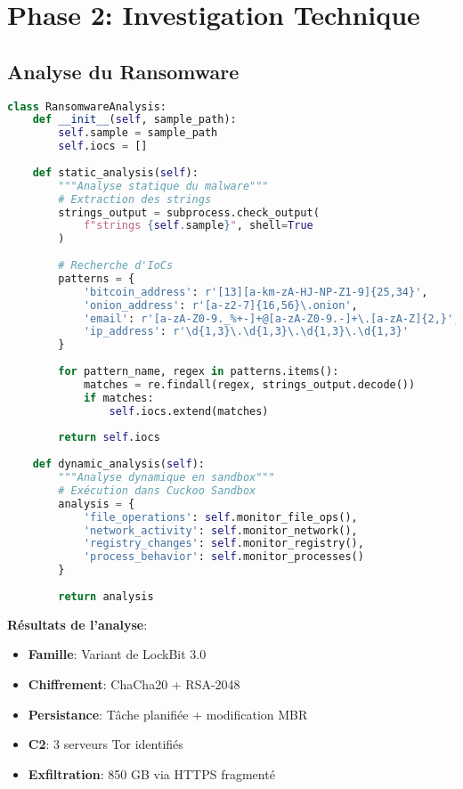 \section{Phase 2: Investigation Technique}
\subsection{Analyse du Ransomware}
\begin{lstlisting}[language=Python, caption=Analyse du sample de ransomware]
class RansomwareAnalysis:
    def __init__(self, sample_path):
        self.sample = sample_path
        self.iocs = []
    
    def static_analysis(self):
        """Analyse statique du malware"""
        # Extraction des strings
        strings_output = subprocess.check_output(
            f"strings {self.sample}", shell=True
        )
        
        # Recherche d'IoCs
        patterns = {
            'bitcoin_address': r'[13][a-km-zA-HJ-NP-Z1-9]{25,34}',
            'onion_address': r'[a-z2-7]{16,56}\.onion',
            'email': r'[a-zA-Z0-9._%+-]+@[a-zA-Z0-9.-]+\.[a-zA-Z]{2,}',
            'ip_address': r'\d{1,3}\.\d{1,3}\.\d{1,3}\.\d{1,3}'
        }
        
        for pattern_name, regex in patterns.items():
            matches = re.findall(regex, strings_output.decode())
            if matches:
                self.iocs.extend(matches)
        
        return self.iocs
    
    def dynamic_analysis(self):
        """Analyse dynamique en sandbox"""
        # Exécution dans Cuckoo Sandbox
        analysis = {
            'file_operations': self.monitor_file_ops(),
            'network_activity': self.monitor_network(),
            'registry_changes': self.monitor_registry(),
            'process_behavior': self.monitor_processes()
        }
        
        return analysis
\end{lstlisting}

\textbf{Résultats de l'analyse}:

\begin{itemize}
\item \textbf{Famille}: Variant de LockBit 3.0
\item \textbf{Chiffrement}: ChaCha20 + RSA-2048
\item \textbf{Persistance}: Tâche planifiée + modification MBR
\item \textbf{C2}: 3 serveurs Tor identifiés
\item \textbf{Exfiltration}: 850 GB via HTTPS fragmenté
\end{itemize}

